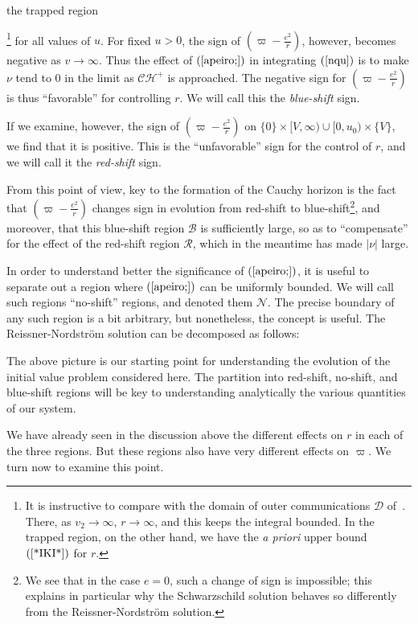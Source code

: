 \documentclass{article}
\begin{document}
the trapped region{\footnote{It is instructive to compare
with the domain of outer communications $\mathcal{D}$ of~\cite{mi:mazi}. 
There, as $v_2\to\infty$,
$r\to\infty$, and this keeps the integral bounded. In the 
trapped region, on the other hand, we have the \emph{a priori} 
upper bound $(\ref{*IKI*})$ for $r$.} for all values of $u$.
For fixed $u>0$, the sign of $\left(\varpi-\frac{e^2}r\right)$, however, becomes
negative as $v\to\infty$. Thus the effect of
$(\ref{apeiro;})$ in integrating $(\ref{nqu})$ is to make
$\nu$ tend to $0$ in the limit as $\mathcal{CH^+}$ is approached.
The negative sign for $\left(\varpi-\frac{e^2}r\right)$ is
thus ``favorable'' for controlling $r$.
We will call this the \emph{blue-shift} sign.

If we examine, however, the sign of $\left(\varpi-\frac{e^2}r\right)$
on $\{0\}\times[V,\infty)\cup[0,u_0)\times\{V\}$, we find that it is positive. 
This is the ``unfavorable'' sign for the control of $r$,
and we will call it the \emph{red-shift} sign.
 

From this point of view, key to the formation
of the Cauchy horizon is the fact that $\left(\varpi-\frac{e^2}r\right)$
changes sign in evolution from red-shift to
blue-shift\footnote{We see that in the case $e=0$,
such a change of sign is impossible; this explains
in particular why
the
Schwarzschild solution
behaves so differently from the
Reissner-Nordstr\"om solution.}, and moreover, that
this blue-shift region $\mathcal{B}$ is sufficiently large, so as
to ``compensate'' for the effect of the red-shift region $\mathcal{R}$, which
in the meantime has made $|\nu|$ large.

In order to understand better the significance of
$(\ref{apeiro;})$,
it is useful to separate out a region 
where $(\ref{apeiro;})$
can be uniformly bounded. We will call such regions
``no-shift'' regions, and denoted them $\mathcal{N}$.
The precise boundary of any such
region is a bit arbitrary, but
nonetheless, the concept is useful. 
The Reissner-Nordstr\"om solution can be decomposed
as follows:
\[

\]

The above picture is our starting point for understanding
the evolution of the initial value problem considered
here. The partition into 
red-shift, no-shift, and blue-shift regions will be key
to understanding analytically the various quantities of
our system. 

We have already seen in the discussion above
the different effects on $r$ in each of the three regions. 
But these regions also have very different effects on $\varpi$.
We turn now to examine this point.

}
\end{document}
